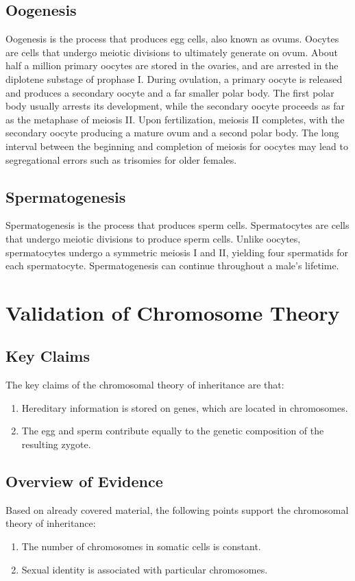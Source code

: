 \documentclass[12pt,titlepage]{article}
\begin{document}
    \subsection{Oogenesis}
      Oogenesis is the process that produces egg cells, also known as ovums. Oocytes are cells that undergo meiotic divisions to ultimately generate on ovum. About half
      a million primary oocytes are stored in the ovaries, and are arrested in the diplotene substage of prophase I. During ovulation, a primary oocyte is released and
      produces a secondary oocyte and a far smaller polar body. The first polar body usually arrests its development, while the secondary oocyte proceeds as far as the
      metaphase of meiosis II. Upon fertilization, meiosis II completes, with the secondary oocyte producing a mature ovum and a second polar body. The long interval
      between the beginning and completion of meiosis for oocytes may lead to segregational errors such as trisomies for older females.

    \subsection{Spermatogenesis}
      Spermatogenesis is the process that produces sperm cells. Spermatocytes are cells that undergo meiotic divisions to produce sperm cells. Unlike oocytes,
      spermatocytes undergo a symmetric meiosis I and II, yielding four spermatids for each spermatocyte. Spermatogenesis can continue throughout a male's lifetime.

  \newpage

  \section{Validation of Chromosome Theory}

    \subsection{Key Claims}
      The key claims of the chromosomal theory of inheritance are that:
      \begin{enumerate}
        \item Hereditary information is stored on genes, which are located in chromosomes.
        \item The egg and sperm contribute equally to the genetic composition of the resulting zygote.
      \end{enumerate}

    \subsection{Overview of Evidence}
      Based on already covered material, the following points support the chromosomal theory of inheritance:
      \begin{enumerate}
        \item The number of chromosomes in somatic cells is constant.
        \item Sexual identity is associated with particular chromosomes.
      \end{enumerate}
\end{document}
